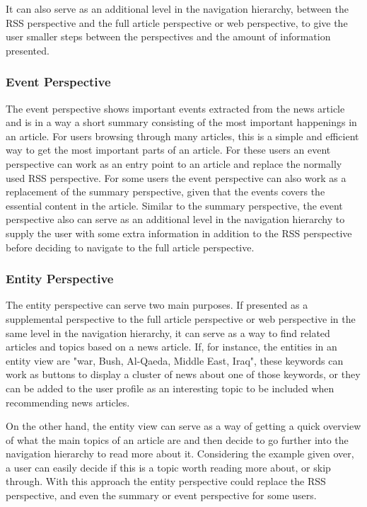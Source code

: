 It can also serve as an additional level in the navigation hierarchy, between the RSS perspective and the full article perspective or web perspective, to give the user smaller steps between the perspectives and the amount of information presented.

\subsubsection{Event Perspective}
The event perspective shows important events extracted from the news article and is in a way a short summary consisting of the most important happenings in an article. For users browsing through many articles, this is a simple and efficient way to get the most important parts of an article. For these users an event perspective can work as an entry point to an article and replace the normally used RSS perspective. For some users the event perspective can also work as a replacement of the summary perspective, given that the events covers the essential content in the article. Similar to the summary perspective, the event perspective also can serve as an additional level in the navigation hierarchy to supply the user with some extra information in addition to the RSS perspective before deciding to navigate to the full article perspective.

\subsubsection{Entity Perspective}
The entity perspective can serve two main purposes. If presented as a supplemental perspective to the full article perspective or web perspective in the same level in the navigation hierarchy, it can serve as a way to find related articles and topics based on a news article. If, for instance, the entities in an entity view are "war, Bush, Al-Qaeda, Middle East, Iraq", these keywords can work as buttons to display a cluster of news about one of those keywords, or they can be added to the user profile as an interesting topic to be included when recommending news articles.

On the other hand, the entity view can serve as a way of getting a quick overview of what the main topics of an article are and then decide to go further into the navigation hierarchy to read more about it. Considering the example given over, a user can easily decide if this is a topic worth reading more about, or skip through. With this approach the entity perspective could replace the RSS perspective, and even the summary or event perspective for some users.


